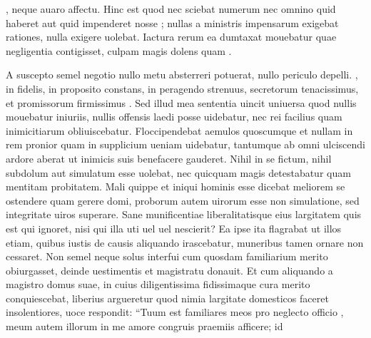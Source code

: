 \documentclass[a5paper,twoside]{article}
\begin{document}
, neque  auaro  affectu. Hinc est quod nec sciebat numerum nec omnino quid haberet aut quid impenderet nosse ; nullas a ministris impensarum exigebat rationes, nulla  exigere uolebat. Iactura rerum ea dumtaxat mouebatur quae negligentia contigisset, culpam magis dolens quam . 

A suscepto semel negotio nullo metu absterreri potuerat, nullo periculo depelli. , in  fidelis, in proposito constans, in peragendo strenuus, secretorum tenacissimus, et promissorum firmissimus . Sed illud mea sententia uincit uniuersa quod nullis mouebatur iniuriis, nullis offensis laedi posse uidebatur, nec  rei facilius quam inimicitiarum obliuiscebatur. Floccipendebat aemulos quoscumque et nullam in rem pronior quam in supplicium ueniam uidebatur, tantumque ab omni ulciscendi ardore aberat ut inimicis suis benefacere gauderet. Nihil in se fictum, nihil subdolum aut simulatum esse uolebat, nec quicquam magis detestabatur quam mentitam probitatem. Mali quippe et iniqui hominis esse dicebat meliorem se  ostendere quam gerere domi, proborum autem uirorum esse non simulatione, sed integritate uiros superare. Sane munificentiae liberalitatisque eius largitatem quis est qui ignoret, nisi qui illa uti uel  uel nescierit? Ea ipse ita flagrabat ut illos etiam, quibus iustis de causis aliquando irascebatur, muneribus tamen ornare non cessaret. Non semel neque solus interfui cum quosdam familiarium merito obiurgasset, deinde uestimentis et magistratu donauit. Et cum aliquando a magistro domus suae, in cuius diligentissima fidissimaque cura merito conquiescebat, liberius argueretur quod nimia  largitate domesticos faceret insolentiores,  uoce respondit: ``Tuum est familiares meos pro neglecto officio , meum autem  illorum in me amore congruis praemiis afficere; id 
\end{document}
